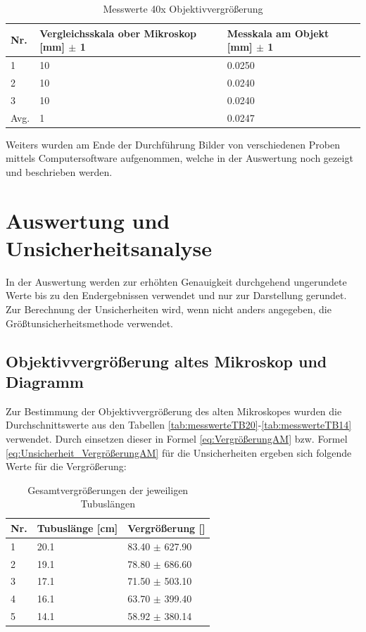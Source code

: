 \documentclass[12pt,a4paper,twoside]{article}
\begin{document}
\begin{table}[H]
    \centering
    \caption{Messwerte 40x Objektivvergrößerung}
    \label{tab:messwerteNM40x}
    \begin{tabular}{| l | l | l |}
        \hline
        Nr.   & Vergleichsskala ober Mikroskop [mm] $\pm$ 1 & Messkala am Objekt [mm] $\pm$ 1 \\
        \hline
        1 & 10 & 0.0250 \\
        2 & 10 & 0.0240 \\
        3 & 10 & 0.0240 \\
        \hline
        Avg. & 1 & 0.0247 \\
        \hline
    \end{tabular}
\end{table}

\noindent
Weiters wurden am Ende der Durchführung Bilder von verschiedenen Proben mittels Computersoftware  aufgenommen, welche in der Auswertung noch gezeigt und beschrieben werden.


\section{Auswertung und Unsicherheitsanalyse} %

In der Auswertung werden zur erhöhten Genauigkeit durchgehend ungerundete Werte bis zu den Endergebnissen verwendet und nur zur Darstellung gerundet. \\
Zur Berechnung der Unsicherheiten wird, wenn nicht anders angegeben, die Größtunsicherheitsmethode verwendet.

\subsection{Objektivvergrößerung altes Mikroskop und Diagramm}
Zur Bestimmung der Objektivvergrößerung des alten Mikroskopes wurden die Durchschnittswerte aus den Tabellen \ref{tab:messwerteTB20}-\ref{tab:messwerteTB14} verwendet.
Durch einsetzen dieser in Formel \ref{eq:VergrößerungAM} bzw. Formel \ref{eq:Unsicherheit_VergrößerungAM} für die Unsicherheiten ergeben sich folgende Werte für die Vergrößerung:

\begin{table}[H]
    \centering
    \caption{Gesamtvergrößerungen der jeweiligen Tubuslängen}
    \label{tab:Gesamtvergrößerung}
    \begin{tabular}{| l | l | l |}
        \hline
        Nr.   & Tubuslänge [cm]  & Vergrößerung [] \\
        \hline
        1 & 20.1 & 83.40 $\pm$ 627.90 \\
        2 & 19.1 & 78.80 $\pm$ 686.60 \\
        3 & 17.1 & 71.50 $\pm$ 503.10 \\
        4 & 16.1 & 63.70 $\pm$ 399.40 \\
        5 & 14.1 & 58.92 $\pm$ 380.14 \\
        \hline
    \end{tabular}
\end{table}
\end{document}
